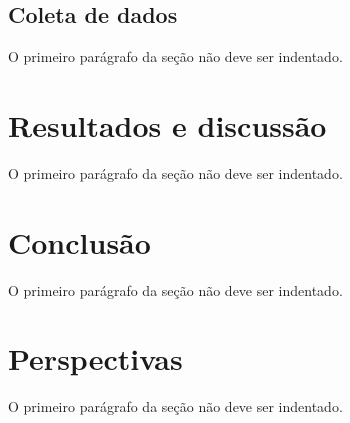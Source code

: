 \documentclass[
	12pt,				%
	openright,			%
	oneside,			%
	a4paper,			%
	english,			%
	brazil				%
	]{abntex2}
\begin{document}


\section{Coleta de dados}

\noindent O primeiro parágrafo da seção não deve ser indentado.

\lipsum[21-22]

\chapter{Resultados e discussão}
\noindent O primeiro parágrafo da seção não deve ser indentado.

\lipsum[24]

\chapter{Conclusão}

\noindent O primeiro parágrafo da seção não deve ser indentado.

\lipsum[25-27]



\chapter{Perspectivas}
\noindent O primeiro parágrafo da seção não deve ser indentado.

\lipsum[31]

\postextual



%
%
\end{document}
